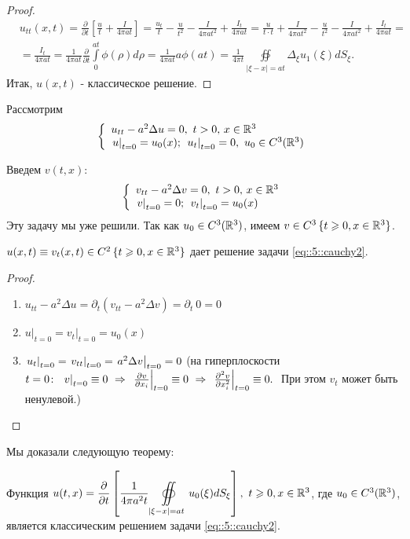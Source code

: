 \documentclass[../main.tex]{subfiles}
\begin{document}
\begin{proof}
\begin{equation*}
\begin{split}
&u_{tt}(x, t)=\frac{\partial}{\partial t}\left[\frac{u}{t}+\frac{I}{4\pi at} \right]=\frac{u_t}{t}-\frac{u}{t^2}-\frac{I}{4\pi at^2}+\frac{I_t}{4\pi at}=\frac{u}{t\cdot t}+\frac{I}{4\pi at^2}-\frac{u}{t^2}-\frac{I}{4\pi at^2}+\frac{I_t}{4\pi at}=\\
&=\frac{I_t}{4\pi at}=\frac{1}{4\pi at}\frac{\partial}{\partial t}\int\limits_0^{at}\phi (\rho )d\rho = \frac{1}{4\pi at}a\phi(at)=\frac{1}{4\pi t}\oiint\limits_{|\xi - x|=at}\Delta_{\xi}u_1(\xi )dS_{\xi}.
\end{split}
\end{equation*}
Итак, $u(x, t)$ - классическое решение.
\end{proof}

Рассмотрим
\begin{equation}
\left\{
  \begin{array}{ll}
  u_{tt}-a^2\Delta u=0,\ t>0,\, x\in \mathbb{R}^3\\
  \left. u\right|_{t=0}=u_0(x);\ \left. u_t\right|_{t=0}=0,\ u_0\in C^3(\mathbb{R}^3)
  \end{array}
\right.
\label{eq::5::cauchy2}
\end{equation}

Введем $v(t, x)$:
\[
\left\{
  \begin{array}{ll}
  v_{tt}-a^2\Delta v=0,\ t>0,\, x\in \mathbb{R}^3\\
  \left. v\right|_{t=0}=0;\ \left. v_t\right|_{t=0}=u_0(x)
  \end{array}
\right.
\]
Эту задачу мы уже решили. Так как $u_0\in C^3(\mathbb{R}^3)$, имеем $v\in C^3\,\{t\geqslant 0, x\in\mathbb{R}^3\}$.
\begin{statement}
$u(x, t)\equiv v_t(x, t)\in C^2\,\{t\geqslant 0, x\in\mathbb{R}^3 \}$ дает решение задачи \eqref{eq::5::cauchy2}.
\end{statement}
\begin{proof}$\ $
\begin{enumerate}
\item $u_{tt} - a^2 \Delta u = \partial_t (v_{tt} - a^2 \Delta v) = \partial_t\: 0 = 0$
\item $\left. u\right|_{t=0}=\left. v_t\right|_{t=0}=u_0(x)$
\item $\left. u_t\right|_{t=0} = \left. v_{tt}\right|_{t=0}=\left. a^2 \Delta v\right|_{t=0}=0$ (на гиперплоскости $t=0\colon\ \while{v}{t=0} \equiv 0\ \Rightarrow\ \while{\pd{v}{x_i}}{t=0} \equiv 0\ \Rightarrow\ \while{\pdd{v}{x_i}}{t=0} \equiv 0.\;$ При этом $v_t$ может быть ненулевой.)
\end{enumerate}
\end{proof}
Мы доказали следующую теорему:
\begin{theorem}
Функция $u(t,x)=\dfrac{\partial}{\partial t}\left[\dfrac{1}{4\pi a^2t}\displaystyle\oiint\limits_{|\xi -x|=at}u_0(\xi )dS_{\xi } \right],\ t\geqslant 0,x\in\mathbb{R}^3$, где $u_0\in C^3(\mathbb{R}^3)$, \\[1em]
является классическим решением задачи \eqref{eq::5::cauchy2}. 
\end{theorem}
\end{document}
